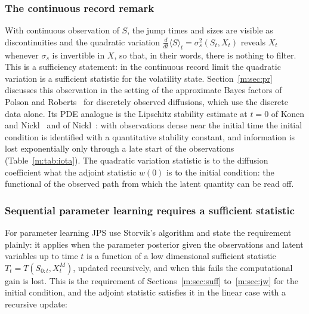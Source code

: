 \subsubsection{The continuous record remark} With continuous observation of $S$, the jump times and sizes are visible as discontinuities and the quadratic variation $\frac{d}{dt}\langle S\rangle_t=\sigma_s^2(S_t,X_t)$ reveals $X_t$ whenever $\sigma_s$ is invertible in $X$, so that, in their words, there is nothing to filter. This is a sufficiency statement: in the continuous record limit the quadratic variation is a sufficient statistic for the volatility state. Section~\ref{m:sec:pr} discusses this observation in the setting of the approximate Bayes factors of Polson and Roberts~\cite{polsonroberts1994} for discretely observed diffusions, which use the discrete data alone. Its PDE analogue is the Lipschitz stability estimate at $t=0$ of Konen and Nickl~\cite{konennickl2026} and of Nickl~\cite{nicklbvm2024}: with observations dense near the initial time the initial condition is identified with a quantitative stability constant, and information is lost exponentially only through a late start of the observations (Table~\ref{m:tab:iota}). The quadratic variation statistic is to the diffusion coefficient what the adjoint statistic $w(0)$ is to the initial condition: the functional of the observed path from which the latent quantity can be read off.

\subsubsection{Sequential parameter learning requires a sufficient statistic} For parameter learning JPS use Storvik's algorithm and state the requirement plainly: it applies when the parameter posterior given the observations and latent variables up to time $t$ is a function of a low dimensional sufficient statistic $T_t=T(S_{0:t},X^M_t)$, updated recursively, and when this fails the computational gain is lost. This is the requirement of Sections~\ref{m:sec:suff} to~\ref{m:sec:jw} for the initial condition, and the adjoint statistic satisfies it in the linear case with a recursive update:

